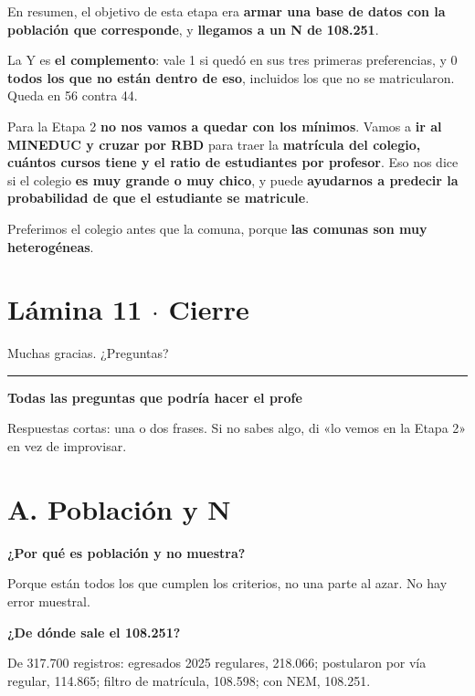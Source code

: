\documentclass[11pt]{article}
\begin{document}
\begin{guion}En resumen, el objetivo de esta etapa era \textbf{armar una base de datos con la población que corresponde}, y \textbf{llegamos a un N de 108.251}.\par La Y es \textbf{el complemento}: vale 1 si quedó en sus tres primeras preferencias, y 0 \textbf{todos los que no están dentro de eso}, incluidos los que no se matricularon. Queda en 56 contra 44.\par Para la Etapa 2 \textbf{no nos vamos a quedar con los mínimos}. Vamos a \textbf{ir al MINEDUC y cruzar por RBD} para traer la \textbf{matrícula del colegio, cuántos cursos tiene y el ratio de estudiantes por profesor}. Eso nos dice si el colegio \textbf{es muy grande o muy chico}, y puede \textbf{ayudarnos a predecir la probabilidad de que el estudiante se matricule}.\par Preferimos el colegio antes que la comuna, porque \textbf{las comunas son muy heterogéneas}.\end{guion}

\section*{Lámina 11 $\cdot$ Cierre}

\begin{guion}Muchas gracias. ¿Preguntas?\end{guion}


\medskip\hrule\medskip

{\LARGE\bfseries Todas las preguntas que podría hacer el profe\par}\medskip

Respuestas cortas: una o dos frases. Si no sabes algo, di «lo vemos en la Etapa 2» en vez de improvisar.\par

\section*{A. Población y N}

\textbf{¿Por qué es población y no muestra?}\par
\begin{guion}Porque están todos los que cumplen los criterios, no una parte al azar. No hay error muestral.\end{guion}

\textbf{¿De dónde sale el 108.251?}\par
\begin{guion}De 317.700 registros: egresados 2025 regulares, 218.066; postularon por vía regular, 114.865; filtro de matrícula, 108.598; con NEM, 108.251.\end{guion}
\end{document}
